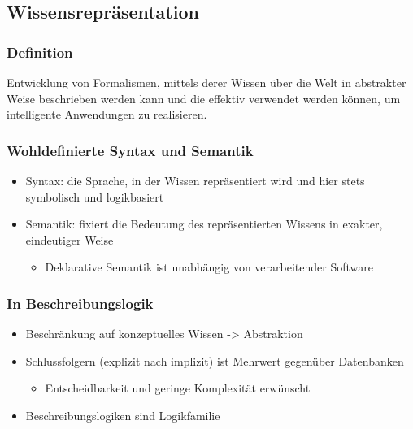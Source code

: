 \subsection{Wissensrepräsentation}\label{wissensrepruxe4sentation}

\subsubsection{Definition}\label{definition}

Entwicklung von Formalismen, mittels derer Wissen über die Welt in
abstrakter Weise beschrieben werden kann und die effektiv verwendet
werden können, um intelligente Anwendungen zu realisieren.

\subsubsection{Wohldefinierte Syntax und
Semantik}\label{wohldefinierte-syntax-und-semantik}

\begin{itemize}
\item
  Syntax: die Sprache, in der Wissen repräsentiert wird und hier stets
  symbolisch und logikbasiert
\item
  Semantik: fixiert die Bedeutung des repräsentierten Wissens in
  exakter, eindeutiger Weise

  \begin{itemize}
  \item
    Deklarative Semantik ist unabhängig von verarbeitender Software
  \end{itemize}
\end{itemize}

\subsubsection{In Beschreibungslogik}\label{in-beschreibungslogik}

\begin{itemize}
\item
  Beschränkung auf konzeptuelles Wissen -\textgreater{} Abstraktion
\item
  Schlussfolgern (explizit nach implizit) ist Mehrwert gegenüber
  Datenbanken

  \begin{itemize}
  \item
    Entscheidbarkeit und geringe Komplexität erwünscht
  \end{itemize}
\item
  Beschreibungslogiken sind Logikfamilie
\end{itemize}